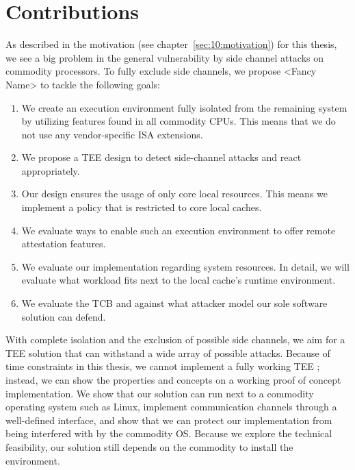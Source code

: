 \section{Contributions}
\label{sec:10:contributions}
As described in the motivation (see chapter~\ref{sec:10:motivation}) for this
thesis, we see a big problem in the general vulnerability by side channel
attacks on commodity processors.
To fully exclude side channels, we propose <Fancy Name> to tackle the following goals:

\begin{enumerate}
    \item We create an execution environment fully isolated from the
          remaining system by utilizing features found in all commodity CPUs. This
          means that we do not use any vendor-specific ISA extensions.
    \item We propose a TEE design to detect side-channel attacks and react
          appropriately.
    \item Our design ensures the usage of only core local resources. This means
          we implement a policy that is restricted to core local caches.
    \item We evaluate ways to enable such an execution environment to offer
          remote attestation features.
    \item We evaluate our implementation regarding system resources. In detail,
          we will evaluate what workload fits next to the local cache's runtime environment.
    \item We evaluate the TCB and against what attacker model our sole software
          solution can defend.
\end{enumerate}

With complete isolation and the exclusion of possible side channels, we aim for a
TEE solution that can withstand a wide array of possible attacks. Because
of time constraints in this thesis, we cannot implement a fully working TEE
; instead, we can show the properties and concepts on a working proof of concept
implementation. We show that our solution can run next to a commodity
operating system such as Linux, implement communication channels through a
well-defined interface, and show that we can protect our implementation
from being interfered with by the commodity OS. Because we explore the technical
feasibility, our solution still depends on the commodity to install the
environment.

